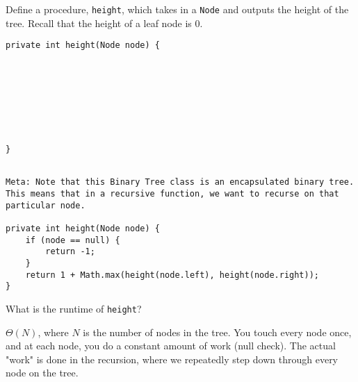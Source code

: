 \question Define a procedure, \texttt{height}, which takes in a \texttt{Node} and outputs the height of the tree. Recall that the height of a leaf node is 0.

\ifprintanswers
\else
\begin{lstlisting}
private int height(Node node) {








}
\end{lstlisting}
\fi

\begin{solution}
\begin{lstlisting}

Meta: Note that this Binary Tree class is an encapsulated binary tree.  
This means that in a recursive function, we want to recurse on that 
particular node.

private int height(Node node) {
    if (node == null) {
        return -1;
    }
    return 1 + Math.max(height(node.left), height(node.right));
}
\end{lstlisting}
\end{solution}

What is the runtime of \texttt{height}?
\begin{solution}[0.25in]
$\Theta(N)$, where $N$ is the number of nodes in the tree.  You touch every node once, and at each node, you do a constant amount of work (null check).  The actual "work" is done in the recursion, where we repeatedly step down through every node on the tree.

\end{solution}
